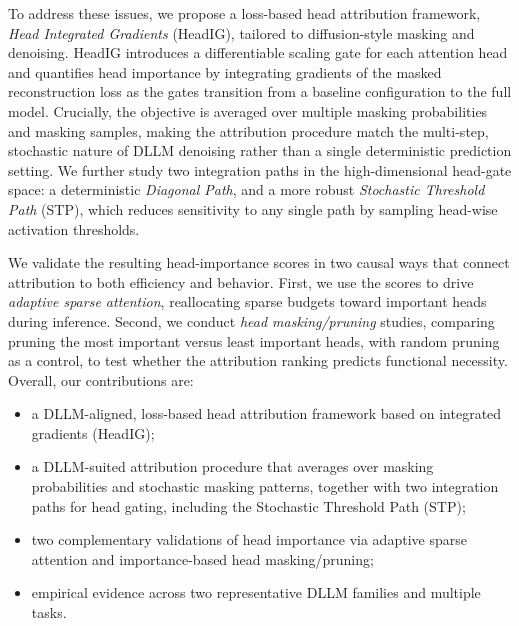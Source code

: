 To address these issues, we propose a loss-based head attribution framework, \emph{Head Integrated Gradients} (HeadIG), tailored to diffusion-style masking and denoising. HeadIG introduces a differentiable scaling gate for each attention head and quantifies head importance by integrating gradients of the masked reconstruction loss as the gates transition from a baseline configuration to the full model. Crucially, the objective is averaged over multiple masking probabilities and masking samples, making the attribution procedure match the multi-step, stochastic nature of DLLM denoising rather than a single deterministic prediction setting. We further study two integration paths in the high-dimensional head-gate space: a deterministic \emph{Diagonal Path}, and a more robust \emph{Stochastic Threshold Path} (STP), which reduces sensitivity to any single path by sampling head-wise activation thresholds.

We validate the resulting head-importance scores in two causal ways that connect attribution to both efficiency and behavior. First, we use the scores to drive \emph{adaptive sparse attention}, reallocating sparse budgets toward important heads during inference. Second, we conduct \emph{head masking/pruning} studies, comparing pruning the most important versus least important heads, with random pruning as a control, to test whether the attribution ranking predicts functional necessity. Overall, our contributions are:
\begin{itemize}
    \item a DLLM-aligned, loss-based head attribution framework based on integrated gradients (HeadIG);
    \item a DLLM-suited attribution procedure that averages over masking probabilities and stochastic masking patterns, together with two integration paths for head gating, including the Stochastic Threshold Path (STP);
    \item two complementary validations of head importance via adaptive sparse attention and importance-based head masking/pruning;
    \item empirical evidence across two representative DLLM families and multiple tasks.
\end{itemize}